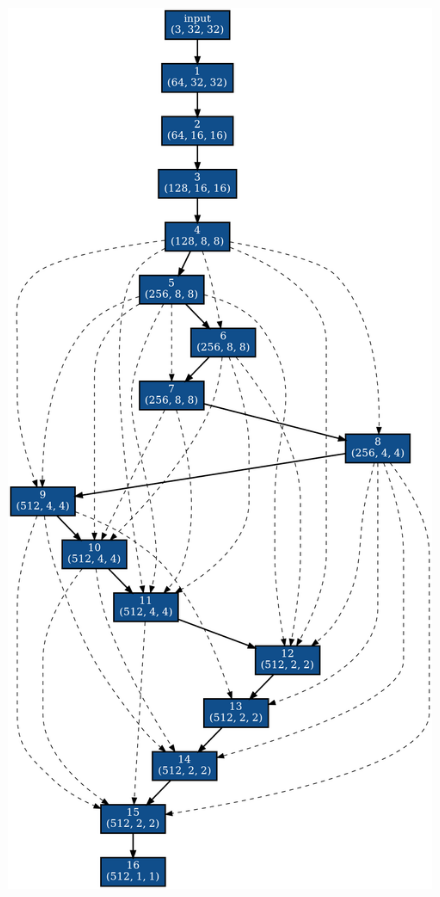 \begin{figure}[tb]
 \begin{minipage}{0.5\hsize}
 	\begin{center}
    \includegraphics[clip,scale=0.2]{./fig/04.exp/base.png}\\

\end{center}
\end{minipage}
\end{figure}
